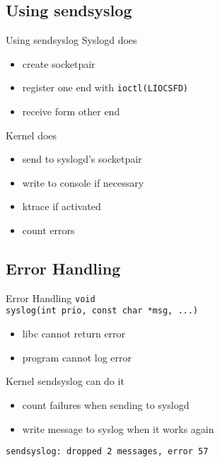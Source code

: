 \documentclass[14pt]{beamer}
\begin{document}
\subsection{Using sendsyslog}
\begin{frame}{Using sendsyslog}
    Syslogd does
\begin{itemize}
    \item create socketpair
    \item register one end with \texttt{ioctl(LIOCSFD)}
    \item receive form other end
\end{itemize}
    \vspace{.5cm}
    Kernel does
\begin{itemize}
    \item send to syslogd's socketpair
    \item write to console if necessary
    \item ktrace if activated
    \item count errors
\end{itemize}
\end{frame}

\subsection{Error Handling}
\begin{frame}{Error Handling}
    \texttt{void \\
	syslog(int prio, const char *msg, ...)}
\begin{itemize}
    \item libc cannot return error
    \item program cannot log error
\end{itemize}
    \vspace{.5cm}
    Kernel sendsyslog can do it
\begin{itemize}
    \item count failures when sending to syslogd
    \item write message to syslog when it works again
\end{itemize}
    \vspace{.5cm}
    \texttt{sendsyslog:\ dropped 2 messages, error 57}
\end{frame}
\end{document}
